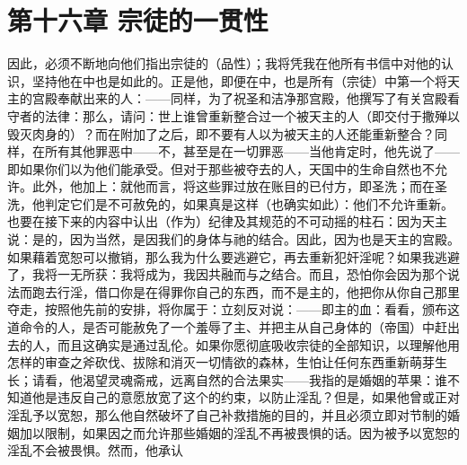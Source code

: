\section{第十六章 宗徒的一贯性}

因此，必须不断地向他们指出宗徒的（品性）；我将凭我在他所有书信中对他的认识，坚持他在中也是如此的。正是他，即便在中，也是所有（宗徒）中第一个将天主的宫殿奉献出来的人：——同样，为了祝圣和洁净那宫殿，他撰写了有关宫殿看守者的法律：那么，请问：世上谁曾重新整合过一个被天主的人（即交付于撒殚以毁灭肉身的）？而在附加了之后，即不要有人以为被天主的人还能重新整合？同样，在所有其他罪恶中——不，甚至是在一切罪恶——当他肯定时，他先说了——即如果你们以为他们能承受。但对于那些被夺去的人，天国中的生命自然也不允许。此外，他加上：就他而言，将这些罪过放在账目的已付方，即圣洗；而在圣洗，他判定它们是不可赦免的，如果真是这样（也确实如此）：他们不允许重新。也要在接下来的内容中认出（作为）纪律及其规范的不可动摇的柱石：因为天主说：是的，因为当然，是因我们的身体与祂的结合。因此，因为也是天主的宫殿。如果藉着宽恕可以撤销，那么我为什么要逃避它，再去重新犯奸淫呢？如果我逃避了，我将一无所获：我将成为，我因共融而与之结合。而且，恐怕你会因为那个说法而跑去行淫，借口你是在得罪你自己的东西，而不是主的，他把你从你自己那里夺走，按照他先前的安排，将你属于：立刻反对说：——即主的血：看看，颁布这道命令的人，是否可能赦免了一个羞辱了主、并把主从自己身体的（帝国）中赶出去的人，而且这确实是通过乱伦。如果你愿彻底吸收宗徒的全部知识，以理解他用怎样的审查之斧砍伐、拔除和消灭一切情欲的森林，生怕让任何东西重新萌芽生长；请看，他渴望灵魂斋戒，远离自然的合法果实——我指的是婚姻的苹果：谁不知道他是违反自己的意愿放宽了这个的约束，以防止淫乱？但是，如果他曾或正对淫乱予以宽恕，那么他自然破坏了自己补救措施的目的，并且必须立即对节制的婚姻加以限制，如果因之而允许那些婚姻的淫乱不再被畏惧的话。因为被予以宽恕的淫乱不会被畏惧。然而，他承认